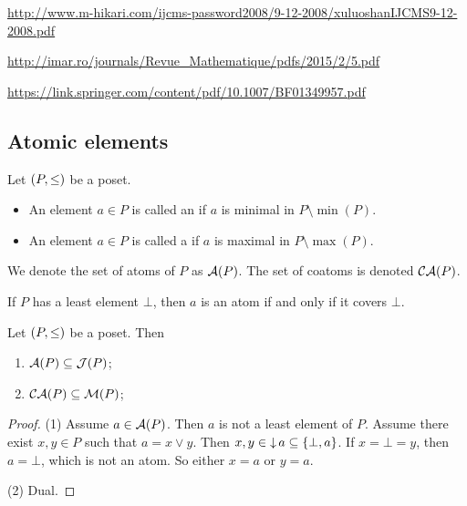\url{http://www.m-hikari.com/ijcms-password2008/9-12-2008/xuluoshanIJCMS9-12-2008.pdf}

\url{http://imar.ro/journals/Revue_Mathematique/pdfs/2015/2/5.pdf}

\url{https://link.springer.com/content/pdf/10.1007/BF01349957.pdf}


\subsection{Atomic elements}
\begin{definition}
Let $\sSet{P,\leq}$ be a poset.
\begin{itemize}
\item An element $a\in P$ is called an  if $a$ is minimal in $P\setminus\min(P)$.
\item An element $a\in P$ is called a  if $a$ is maximal in $P\setminus\max(P)$.
\end{itemize}
We denote the set of atoms of $P$ as $\operatorname{\mathcal{A}}(P)$. The set of coatoms is denoted $\operatorname{\mathcal{CA}}(P)$.
\end{definition}
If $P$ has a least element $\bot$, then $a$ is an atom if and only if it covers $\bot$.

\begin{lemma} \label{atomsJoinIrriducible}
Let $\sSet{P,\leq}$ be a poset. Then
\begin{enumerate}
\item $\operatorname{\mathcal{A}}(P) \subseteq \operatorname{\mathcal{J}}(P)$;
\item $\operatorname{\mathcal{CA}}(P) \subseteq \operatorname{\mathcal{M}}(P)$;
\end{enumerate}
\end{lemma}
\begin{proof}
(1) Assume $a\in \operatorname{\mathcal{A}}(P)$. Then $a$ is not a least element of $P$. Assume there exist $x,y\in P$ such that $a = x\vee y$. Then $x,y\in \operatorname{\downarrow} a \subseteq \{\bot, a\}$. If $x= \bot = y$, then $a = \bot$, which is not an atom. So either $x = a$ or $y = a$.

(2) Dual.
\end{proof}

